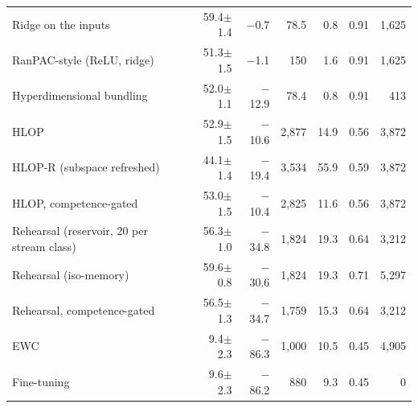 \begin{tabular*}{\textwidth}{@{\extracolsep{\fill}}lrrrrrr@{}}
Ridge on the inputs & 59.4$\pm$1.4 & \ensuremath{-}0.7 & 78.5 & 0.8 & 0.91 & 1,625 \\
RanPAC-style (ReLU, ridge) & 51.3$\pm$1.5 & \ensuremath{-}1.1 & 150 & 1.6 & 0.91 & 1,625 \\
Hyperdimensional bundling & 52.0$\pm$1.1 & \ensuremath{-}12.9 & 78.4 & 0.8 & 0.91 & 413 \\
HLOP & 52.9$\pm$1.5 & \ensuremath{-}10.6 & 2,877 & 14.9 & 0.56 & 3,872 \\
HLOP-R (subspace refreshed) & 44.1$\pm$1.4 & \ensuremath{-}19.4 & 3,534 & 55.9 & 0.59 & 3,872 \\
HLOP, competence-gated & 53.0$\pm$1.5 & \ensuremath{-}10.4 & 2,825 & 11.6 & 0.56 & 3,872 \\
Rehearsal (reservoir, 20 per stream class) & 56.3$\pm$1.0 & \ensuremath{-}34.8 & 1,824 & 19.3 & 0.64 & 3,212 \\
Rehearsal (iso-memory) & 59.6$\pm$0.8 & \ensuremath{-}30.6 & 1,824 & 19.3 & 0.71 & 5,297 \\
Rehearsal, competence-gated & 56.5$\pm$1.3 & \ensuremath{-}34.7 & 1,759 & 15.3 & 0.64 & 3,212 \\
EWC & 9.4$\pm$2.3 & \ensuremath{-}86.3 & 1,000 & 10.5 & 0.45 & 4,905 \\
Fine-tuning & 9.6$\pm$2.3 & \ensuremath{-}86.2 & 880 & 9.3 & 0.45 & 0 \\
\bottomrule
\end{tabular*}
